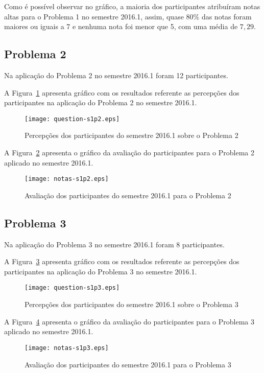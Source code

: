 Como é possível observar no gráfico, a maioria dos participantes atribuíram
notas altas para o Problema 1 no semestre 2016.1, assim, quase $80\%$ das notas
foram maiores ou iguais a 7 e nenhuma nota foi menor que 5, com uma média
de $7,29$.
  
\subsection{Problema 2}
Na aplicação do Problema 2 no semestre 2016.1 foram 12 participantes.

A Figura~\ref{percep-s1p2} apresenta gráfico com os resultados referente
as percepções dos participantes na aplicação do
Problema 2 no semestre 2016.1.

\begin{figure}[!htb]
\centering
\texttt{[image: question-s1p2.eps]}
\caption{Percepções dos participantes do semestre 2016.1 sobre o Problema 2}
\label{percep-s1p2}
\end{figure}

A Figura~\ref{aval-s1p2} apresenta o gráfico da
avaliação do participantes para o Problema 2 aplicado no semestre 2016.1.

\begin{figure}[!htb]
\centering
\texttt{[image: notas-s1p2.eps]}
\caption{Avaliação dos participantes do semestre 2016.1 para o Problema 2}
\label{aval-s1p2}
\end{figure}

\subsection{Problema 3}
Na aplicação do Problema 3 no semestre 2016.1 foram 8 participantes.

A Figura~\ref{percep-s1p3} apresenta gráfico com os resultados referente
as percepções dos participantes na aplicação do
Problema 3 no semestre 2016.1.

\begin{figure}[!htb]
\centering
\texttt{[image: question-s1p3.eps]}
\caption{Percepções dos participantes do semestre 2016.1 sobre o Problema 3}
\label{percep-s1p3}
\end{figure}

A Figura~\ref{aval-s1p3} apresenta o gráfico da
avaliação do participantes para o Problema 3 aplicado no semestre 2016.1.

\begin{figure}[!htb]
\centering
\texttt{[image: notas-s1p3.eps]}
\caption{Avaliação dos participantes do semestre 2016.1 para o Problema 3}
\label{aval-s1p3}
\end{figure}

